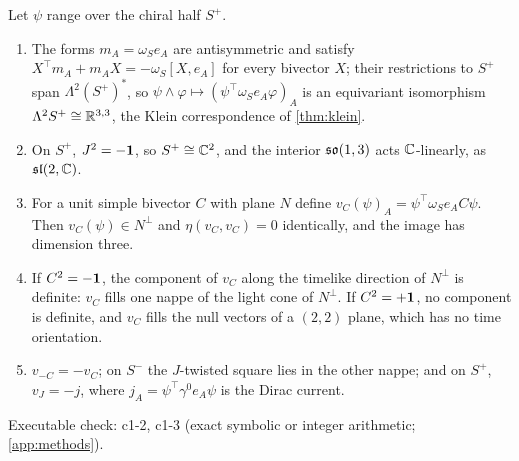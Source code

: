\begin{theorem}
\label{thm:cone}
Let $\psi$ range over the chiral half $S^+$.
\begin{enumerate}[label=(\roman*),leftmargin=2.2em]
\item The forms $m_A=\omega_Se_A$ are antisymmetric and satisfy $X^{\!\top}m_A+m_AX=-\omega_S[X,e_A]$ for every bivector $X$; their restrictions to $S^+$ span
$\Lambda^2(S^+)^*$, so $\psi\wedge\varphi\mapsto(\psi^{\!\top}\omega_Se_A\varphi)_A$ is an equivariant isomorphism $\Lambda^2S^+\cong\mathbb{R}^{3,3}$, the Klein correspondence of
\cref{thm:klein}.
\item On $S^+$, $J^2=-\mathbf 1$, so $S^+\cong\mathbb{C}^2$, and the interior $\mathfrak{so}(1,3)$ acts $\mathbb{C}$-linearly, as $\mathfrak{sl}(2,\mathbb{C})$.
\item For a unit simple bivector $C$ with plane $N$ define $v_C(\psi)_A=\psi^{\!\top}\omega_Se_AC\psi$. Then $v_C(\psi)\in N^\perp$ and $\eta(v_C,v_C)=0$ identically,
and the image has dimension three.
\item If $C^2=-\mathbf 1$, the component of $v_C$ along the timelike direction of $N^\perp$ is definite: $v_C$ fills one nappe of the light cone of $N^\perp$. If
$C^2=+\mathbf 1$, no component is definite, and $v_C$ fills the null vectors of a $(2,2)$ plane, which has no time orientation.
\item $v_{-C}=-v_C$; on $S^-$ the $J$-twisted square lies in the other nappe; and on $S^+$, $v_J=-j$, where $j_A=\psi^{\!\top}\gamma^0e_A\psi$ is the Dirac current.
\end{enumerate}
\end{theorem}

\noindent Executable check: c1-2, c1-3 (exact symbolic or integer arithmetic; \cref{app:methods}).

